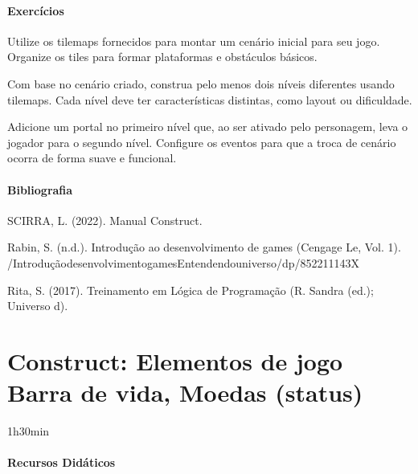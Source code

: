 \documentclass[letterpaper,10pt,brazil]{sphinxmanual}
\begin{document}
\subsubsection*{Exercícios}

\sphinxAtStartPar
{}
Utilize os tilemaps fornecidos para montar um cenário inicial para seu jogo.
Organize os tiles para formar plataformas e obstáculos básicos.

\sphinxAtStartPar
{}
Com base no cenário criado, construa pelo menos dois níveis diferentes usando tilemaps.
Cada nível deve ter características distintas, como layout ou dificuldade.

\sphinxAtStartPar
{}
Adicione um portal no primeiro nível que, ao ser ativado pelo personagem, leva o jogador para o segundo nível.
Configure os eventos para que a troca de cenário ocorra de forma suave e funcional.
\subsubsection*{Bibliografia}

\sphinxAtStartPar
SCIRRA, L. (2022). Manual Construct.

\sphinxAtStartPar
Rabin, S. (n.d.). Introdução ao desenvolvimento de games (Cengage Le, Vol. 1).
/Introdução\sphinxhyphen{}desenvolvimento\sphinxhyphen{}games\sphinxhyphen{}Entendendo\sphinxhyphen{}universo/dp/852211143X

\sphinxAtStartPar
Rita, S. (2017). Treinamento em Lógica de Programação (R. Sandra (ed.); Universo d).

\sphinxstepscope


\chapter{Construct: Elementos de jogo \sphinxhyphen{} Barra de vida, Moedas (status)}
\label{\detokenize{modelo_aula_10:construct-elementos-de-jogo-barra-de-vida-moedas-status}}\label{\detokenize{modelo_aula_10::doc}}
\sphinxAtStartPar
{} 1h30min
\subsubsection*{Recursos Didáticos}
\end{document}
